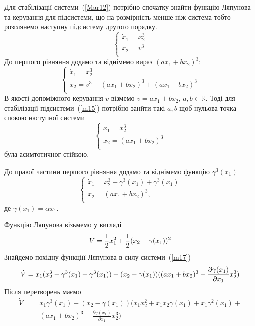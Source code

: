 \documentclass{article}
\begin{document}
Для стабілізації системи~(\ref{Mar12}) потрібно спочатку знайти функцію Ляпунова
та керування для підсистеми, що на розмірність менше ніж система  тобто розглянемо 
наступну підсистему другого порядку. 
\begin{equation}
    \begin{cases}
    \dot x_1 = x_2^3\\
    \dot x_2 = v^3\\
    \end{cases}
\end{equation}
До першого рівняння додамо та віднімемо вираз $(ax_1+bx_2)^3$:
\begin{equation}\label{m15}
    \begin{cases}
    \dot x_1 = x_{2}^3 \\
    \dot x_2 = v^3 - (ax_1+bx_2)^3 +(ax_1+bx_2)^3 \\
    \end{cases}
\end{equation}
В якості допоміжного керування $v$ візмемо $v=ax_1+bx_2$, $a,b \in \mathbb{R}$. Тоді
для стабілізації підсистеми~(\ref{m15}) потрібно занйти такі  $a,b$ щоб нульова точка спокою 
наступної системи
\begin{equation}
    \begin{cases}
    \dot x_1 =x_{2}^3 \\
    \dot x_2 =(ax_1+bx_2)^3 \\
    \end{cases}
\end{equation}
була асимтотичног стійкою.


До правої частини першого рівняння додамо та віднімемо функцію $\gamma^3(x_1)$ 
\begin{equation} \label{m17}
    \begin{cases}
    \dot x_1 =x_{2}^3 -\gamma^3(x_1)+\gamma^3(x_1) \\
    \dot x_2 = (ax_1+bx_2)^3,\\
    \end{cases}
\end{equation}
де $\gamma(x_1) = \alpha x_1$.

Функцію Ляпунова візьмемо у вигляді  
\begin{equation}
    V = \frac{1}{2}x_{1}^2 +\frac{1}{2}(x_2 - \gamma(x_1) )^2\\
\end{equation}
Знайдемо похідну функціїї Ляпунова в силу системи~(\ref{m17})
\begin{equation}
    \dot V = x_1(x_2^3 - \gamma^3(x_1)+\gamma^3(x_1)) + \\
    (x_2 - \gamma(x_1))( (ax_1+bx_2)^3-\frac{\partial \gamma(x_1)}{\partial x_1}x_2^3)
\end{equation}
Після перетворень маємо
\begin{eqnarray}
    \dot V&=& x_1\gamma^3(x_1)+(x_2 - \gamma(x_1))
   \Big (x_1x_2^2 + x_1x_2\gamma(x_1) + x_{1}\gamma^2(x_1) +\nonumber\\ 
    &&(ax_1+bx_2)^3 - \frac{\partial \gamma(x_1)}{\partial x_1}x_{2}^3\Big)
\end{eqnarray}
\end{document}
